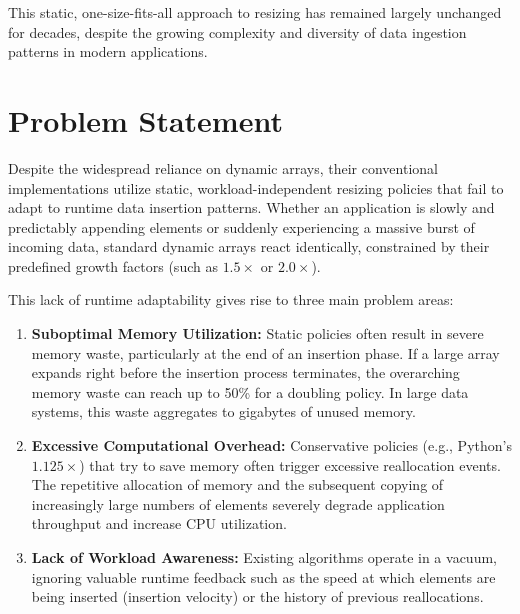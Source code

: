 This static, one-size-fits-all approach to resizing has remained largely 
unchanged for decades, despite the growing complexity and diversity of data 
ingestion patterns in modern applications.

\section{Problem Statement}
Despite the widespread reliance on dynamic arrays, their conventional 
implementations utilize static, workload-independent resizing policies that 
fail to adapt to runtime data insertion patterns. Whether an application is 
slowly and predictably appending elements or suddenly experiencing a massive 
burst of incoming data, standard dynamic arrays react identically, constrained 
by their predefined growth factors (such as $1.5\times$ or $2.0\times$).

This lack of runtime adaptability gives rise to three main problem areas:
\begin{enumerate}
    \item \textbf{Suboptimal Memory Utilization:} Static policies often result 
    in severe memory waste, particularly at the end of an insertion phase. If 
    a large array expands right before the insertion process terminates, the 
    overarching memory waste can reach up to 50\% for a doubling policy. In large 
    data systems, this waste aggregates to gigabytes of unused memory.
    \item \textbf{Excessive Computational Overhead:} Conservative policies (e.g., 
    Python's $1.125\times$) that try to save memory often trigger excessive 
    reallocation events. The repetitive allocation of memory and the subsequent 
    copying of increasingly large numbers of elements severely degrade application 
    throughput and increase CPU utilization.
    \item \textbf{Lack of Workload Awareness:} Existing algorithms operate in a 
    vacuum, ignoring valuable runtime feedback such as the speed at which 
    elements are being inserted (insertion velocity) or the history of previous 
    reallocations. 
\end{enumerate}



